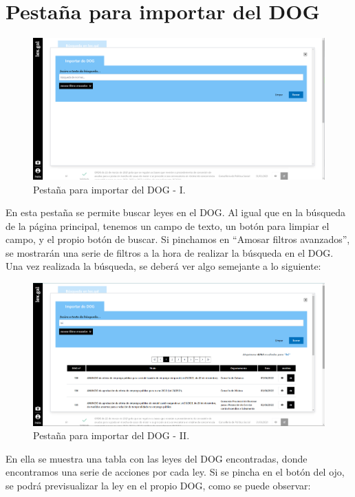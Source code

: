 \section{Pestaña para importar del DOG}
\label{PBusquedaDOG}

\begin{figure}[H]
\centerline{\includegraphics[width=12cm]{figuras/manualUsuario/BuscarDOG.PNG}}
\caption{Pestaña para importar del DOG - I.}
\label{enlacePBusquedaDOG}
\end{figure}

En esta pestaña se permite buscar leyes en el DOG. Al igual que en la búsqueda de la página principal, tenemos un campo de texto, un botón para limpiar el campo, y el propio botón de buscar. Si pinchamos en ``Amosar filtros avanzados'', se mostrarán una serie de filtros a la hora de realizar la búsqueda en el DOG.
\\

Una vez realizada la búsqueda, se deberá ver algo semejante a lo siguiente:

\begin{figure}[H]
\centerline{\includegraphics[width=12cm]{figuras/manualUsuario/BuscarDOGCompleta.PNG}}
\caption{Pestaña para importar del DOG - II.}
\label{enlacePBusquedaCDOG}
\end{figure}

En ella se muestra una tabla con las leyes del DOG encontradas, donde encontramos una serie de acciones por cada ley. Si se pincha en el botón del ojo, se podrá previsualizar la ley en el propio DOG, como se puede observar:


